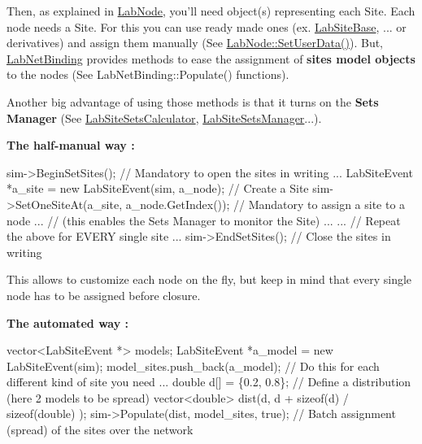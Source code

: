 Then, as explained in \hyperlink{classelps_1_1_lab_node}{Lab\+Node}, you'll need object(s) representing each Site. Each node needs a Site. For this you can use ready made ones (ex. \hyperlink{classelps_1_1_lab_site_base}{Lab\+Site\+Base}, ... or derivatives) and assign them manually (See \hyperlink{classelps_1_1_lab_node_a598cae3d92eec4d3a54978d23ec9c777}{Lab\+Node\+::\+Set\+User\+Data()}). But, \hyperlink{classelps_1_1_lab_net_binding}{Lab\+Net\+Binding} provides methods to ease the assignment of {\bfseries sites model objects} to the nodes (See Lab\+Net\+Binding\+::\+Populate() functions).

Another big advantage of using those methods is that it turns on the {\bfseries Sets Manager} (See \hyperlink{classelps_1_1_lab_site_sets_calculator}{Lab\+Site\+Sets\+Calculator}, \hyperlink{classelps_1_1_lab_site_sets_manager}{Lab\+Site\+Sets\+Manager}...).

{\bfseries The half-\/manual way \+:}


\begin{DoxyCode}
sim->BeginSetSites();                                     \textcolor{comment}{// Mandatory to open the sites in writing}
...
LabSiteEvent *a\_site = \textcolor{keyword}{new} LabSiteEvent(sim, a\_node);     \textcolor{comment}{// Create a Site}
sim->SetOneSiteAt(a\_site, a\_node.GetIndex());             \textcolor{comment}{// Mandatory to assign a site to a node}
...                                                       \textcolor{comment}{// (this enables the Sets Manager to monitor the
       Site)}
...
...                                                       \textcolor{comment}{// Repeat the above for EVERY single site}
...
sim->EndSetSites();                                       \textcolor{comment}{// Close the sites in writing}
\end{DoxyCode}


This allows to customize each node on the fly, but keep in mind that every single node has to be assigned before closure.

{\bfseries The automated way \+:}


\begin{DoxyCode}
vector<LabSiteEvent *> models;
LabSiteEvent *a\_model = \textcolor{keyword}{new} LabSiteEvent(sim);
model\_sites.push\_back(a\_model);                           \textcolor{comment}{// Do this for each different kind of site you
       need}
...
double d[] = \{0.2, 0.8\};                                  \textcolor{comment}{// Define a distribution (here 2 models to be
       spread)}
vector<double> dist(d, d + \textcolor{keyword}{sizeof}(d) / \textcolor{keyword}{sizeof}(\textcolor{keywordtype}{double}) );
sim->Populate(dist, model\_sites, \textcolor{keyword}{true});                   \textcolor{comment}{// Batch assignment (spread) of the sites over
       the network}
\end{DoxyCode}


